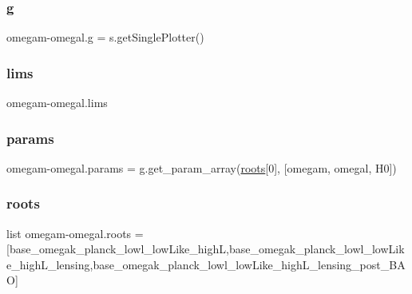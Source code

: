 \subsubsection{\texorpdfstring{g}{g}}
{\footnotesize\ttfamily omegam-\/omegal.\+g = s.\+get\+Single\+Plotter()}

\mbox{\label{namespaceomegam-omegal_a95c2fb2d34f5ca5534b06c1360103b1e}} 
\subsubsection{\texorpdfstring{lims}{lims}}
{\footnotesize\ttfamily omegam-\/omegal.\+lims}

\mbox{\label{namespaceomegam-omegal_ab7ba8589a0821c23569cc7a92c334bb3}} 
\subsubsection{\texorpdfstring{params}{params}}
{\footnotesize\ttfamily omegam-\/omegal.\+params = g.\+get\+\_\+param\+\_\+array(\mbox{\hyperlink{namespaceomegam-omegal_a4c44907be0efd6e53ade38200d4441eb}{roots}}\mbox{[}0\mbox{]}, \mbox{[}\textquotesingle{}omegam\textquotesingle{}, \textquotesingle{}omegal\textquotesingle{}, \textquotesingle{}H0\textquotesingle{}\mbox{]})}

\mbox{\label{namespaceomegam-omegal_a4c44907be0efd6e53ade38200d4441eb}} 
\subsubsection{\texorpdfstring{roots}{roots}}
{\footnotesize\ttfamily list omegam-\/omegal.\+roots = \mbox{[}\textquotesingle{}base\+\_\+omegak\+\_\+planck\+\_\+lowl\+\_\+low\+Like\+\_\+highL\textquotesingle{},\textquotesingle{}base\+\_\+omegak\+\_\+planck\+\_\+lowl\+\_\+low\+Like\+\_\+high\+L\+\_\+lensing\textquotesingle{},\textquotesingle{}base\+\_\+omegak\+\_\+planck\+\_\+lowl\+\_\+low\+Like\+\_\+high\+L\+\_\+lensing\+\_\+post\+\_\+\+B\+AO\textquotesingle{}\mbox{]}}

